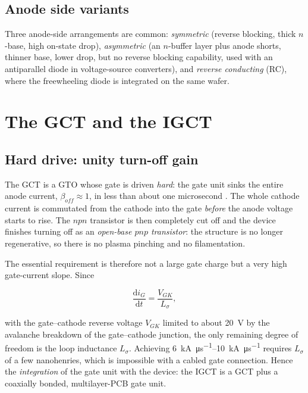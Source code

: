 \documentclass[11pt,a4paper]{report}
\begin{document}
\subsection{Anode side variants}

Three anode-side arrangements are common: \emph{symmetric} (reverse blocking,
thick $n$-base, high on-state drop), \emph{asymmetric} (an $n$-buffer layer plus
anode shorts, thinner base, lower drop, but no reverse blocking capability, used
with an antiparallel diode in voltage-source converters), and \emph{reverse
conducting} (RC), where the freewheeling diode is integrated on the same wafer.

\section{The GCT and the IGCT}

\subsection{Hard drive: unity turn-off gain}

The GCT is a GTO whose gate is driven \emph{hard}: the gate unit sinks the entire
anode current, $\beta_{off} \approx 1$, in less than about one microsecond
\cite{gruening1996harddrive,klaka1997igct}. The whole cathode current is
commutated from the cathode into the gate \emph{before} the anode voltage starts
to rise. The $npn$ transistor is then completely cut off and the device
finishes turning off as an \emph{open-base $pnp$ transistor}: the structure is no
longer regenerative, so there is no plasma pinching and no filamentation.

The essential requirement is therefore not a large gate charge but a very high
gate-current slope. Since

\begin{equation}
\frac{\mathrm{d}i_{G}}{\mathrm{d}t} = \frac{V_{GK}}{L_{\sigma}},
\label{eq:didt}
\end{equation}

with the gate--cathode reverse voltage $V_{GK}$ limited to about
\SI{20}{\volt} by the avalanche breakdown of the gate--cathode junction, the
only remaining degree of freedom is the loop inductance $L_{\sigma}$. Achieving
\SIrange{6}{10}{\kilo\ampere\per\micro\second} requires $L_{\sigma}$ of a few
nanohenries, which is impossible with a cabled gate connection. Hence the
\emph{integration} of the gate unit with the device: the IGCT is a GCT plus a
coaxially bonded, multilayer-PCB gate unit.
\end{document}
